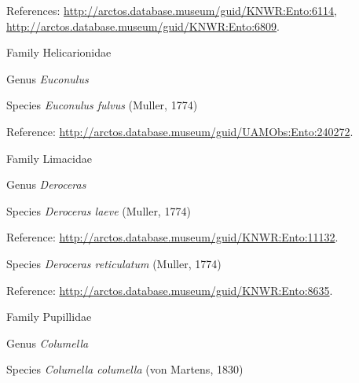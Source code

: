 \documentclass[9pt, article]{memoir}
\begin{document}
\begin{multicols}{2}
\vspace{6pt}References: 
\url{http://arctos.database.museum/guid/KNWR:Ento:6114}, 
\url{http://arctos.database.museum/guid/KNWR:Ento:6809}.

\vspace{6pt}\noindent\hspace{24pt}Family Helicarionidae


\vspace{6pt}\noindent\hspace{30pt}Genus \textit{Euconulus}


\vspace{6pt}\noindent\hspace{36pt}Species \textit{Euconulus fulvus} (Muller, 1774)


\vspace{6pt}Reference: 
\url{http://arctos.database.museum/guid/UAMObs:Ento:240272}.

\vspace{6pt}\noindent\hspace{24pt}Family Limacidae


\vspace{6pt}\noindent\hspace{30pt}Genus \textit{Deroceras}


\vspace{6pt}\noindent\hspace{36pt}Species \textit{Deroceras laeve} (Muller, 1774)


\vspace{6pt}Reference: 
\url{http://arctos.database.museum/guid/KNWR:Ento:11132}.

\vspace{6pt}\noindent\hspace{36pt}Species \textit{Deroceras reticulatum} (Muller, 1774)


\vspace{6pt}Reference: 
\url{http://arctos.database.museum/guid/KNWR:Ento:8635}.

\vspace{6pt}\noindent\hspace{24pt}Family Pupillidae


\vspace{6pt}\noindent\hspace{30pt}Genus \textit{Columella}


\vspace{6pt}\noindent\hspace{36pt}Species \textit{Columella columella} (von Martens, 1830)



\end{multicols}
\end{document}
